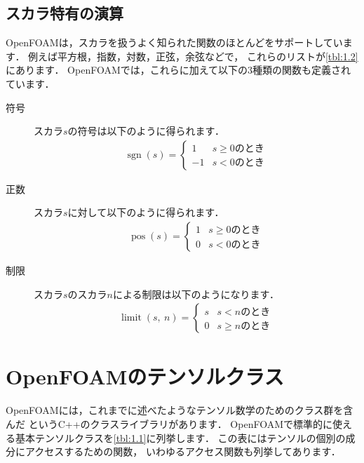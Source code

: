 \subsection{スカラ特有の演算}
\label{ssec:1.3.10}
OpenFOAMは，スカラを扱うよく知られた関数のほとんどをサポートしています．
例えば平方根，指数，対数，正弦，余弦などで，
これらのリストが\autoref{tbl:1.2}にあります．
OpenFOAMでは，これらに加えて以下の$3$種類の関数も定義されています．
\begin{description}
 \item[符号] スカラ$s$の符号は以下のように得られます．
            \begin{align}
             \label{eq:1.41}
             \mathop{\mathrm{sgn}}(s) =
             \begin{cases}
              1 & \text{$s \ge 0$のとき} \\
              -1 & \text{$s < 0$のとき}
             \end{cases}
            \end{align}
 \item[正数] スカラ$s$に対して以下のように得られます．
            \begin{align}
             \label{eq:1.42}
             \mathop{\mathrm{pos}}(s) =
             \begin{cases}
              1 & \text{$s \ge 0$のとき} \\
              0 & \text{$s < 0$のとき}
             \end{cases}
            \end{align}
 \item[制限] スカラ$s$のスカラ$n$による制限は以下のようになります．
            \begin{align}
             \label{eq:1.43}
             \mathop{\mathrm{limit}}(s,\ n) =
             \begin{cases}
              s & \text{$s < n$のとき} \\
              0 & \text{$s \ge n$のとき}
             \end{cases}
            \end{align}
\end{description}



\section{OpenFOAMのテンソルクラス}
\label{sec:1.4}
OpenFOAMには，これまでに述べたようなテンソル数学のためのクラス群を含んだ
というC++のクラスライブラリがあります．
OpenFOAMで標準的に使える基本テンソルクラスを\autoref{tbl:1.1}に列挙します．
この表にはテンソルの個別の成分にアクセスするための関数，
いわゆるアクセス関数も列挙してあります．


